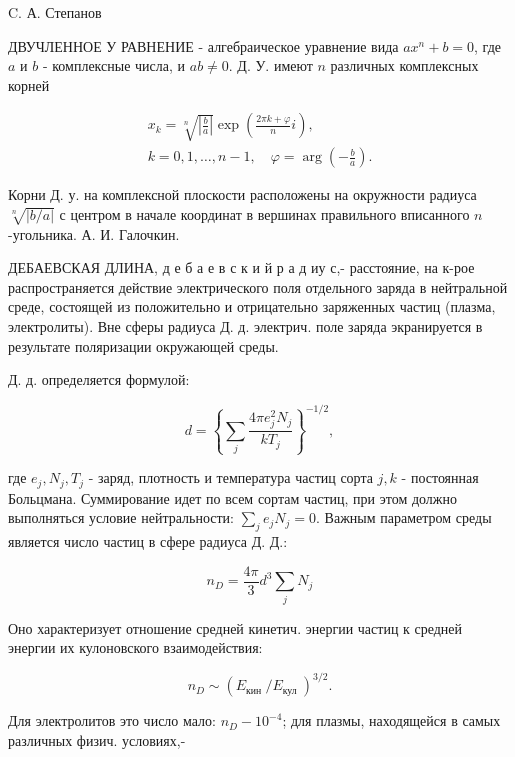 \documentclass[10pt]{article}
\begin{document}
C. А. Степанов



ДВУЧЛЕННОЕ У РАВНЕНИЕ - алгебраическое уравнение вида $a x^{n}+b=0$, где $a$ и $b$ - комплексные числа, и $a b \neq 0$. Д. У. имеют $n$ различных комплексных корней



\[

\begin{gathered}

x_{k}=\sqrt[n]{\left|\frac{b}{a}\right|} \exp \left(\frac{2 \pi k+\varphi}{n} i\right), \\

k=0,1, \ldots, n-1, \quad \varphi=\arg \left(-\frac{b}{a}\right) .

\end{gathered}

\]



Корни Д. у. на комплексной плоскости расположены на окружности радиуса $\sqrt[n]{|b / a|}$ с центром в начале координат в вершинах правильного вписанного $n$-угольника. А. И. Галочкин.



ДЕБАЕВСКАЯ ДЛИНА, д е б а е в с к и й р а д иу с,- расстояние, на к-рое распространяется действие электрического поля отдельного заряда в нейтральной среде, состоящей из положительно и отрицательно заряженных частиц (плазма, электролиты). Вне сферы радиуса Д. д. электрич. поле заряда экранируется в результате поляризации окружающей среды.



Д. д. определяется формулой:



\[

d=\left\{\sum_{j} \frac{4 \pi e_{j}^{2} N_{j}}{k T_{j}}\right\}^{-1 / 2},

\]



где $e_{j}, N_{j}, T_{j}$ - заряд, плотность и температура частиц сорта $j, k$ - постоянная Больцмана. Суммирование идет по всем сортам частиц, при этом должно выполняться условие нейтральности: $\sum_{j} e_{j} N_{j}=0$. Важным параметром среды является число частиц в сфере радиуса Д. Д.:



\[

n_{D}=\frac{4 \pi}{3} d^{3} \sum_{j} N_{j}

\]



Оно характеризует отношение средней кинетич. энергии частиц к средней энергии их кулоновского взаимодействия:



\[

n_{D} \sim\left(E_{\text {кин }} / E_{\text {кул }}\right)^{3 / 2} .

\]



Для электролитов это число мало: $n_{D}-10^{-4}$; для плазмы, находящейся в самых различных физич. условиях,-
\end{document}
